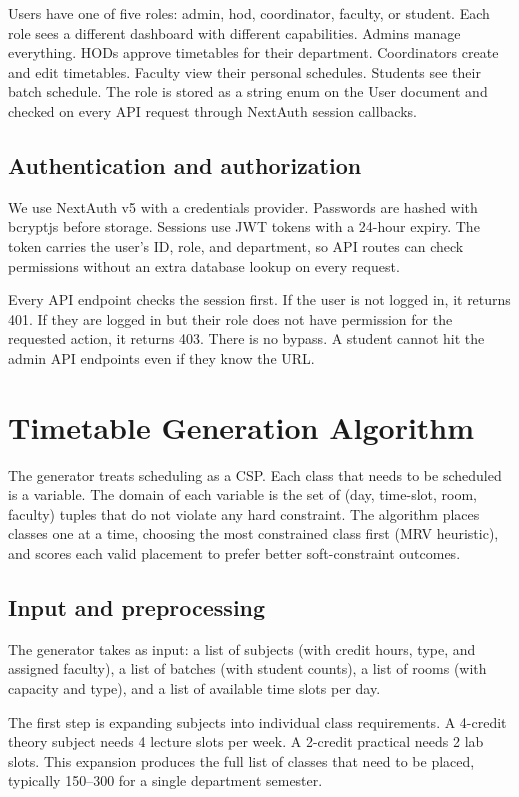 \documentclass[conference]{IEEEtran}
\begin{document}
Users have one of five roles: admin, hod, coordinator, faculty, or student. Each role sees a different dashboard with different capabilities. Admins manage everything. HODs approve timetables for their department. Coordinators create and edit timetables. Faculty view their personal schedules. Students see their batch schedule. The role is stored as a string enum on the User document and checked on every API request through NextAuth session callbacks.

\subsection{Authentication and authorization}

We use NextAuth v5 with a credentials provider. Passwords are hashed with bcryptjs before storage. Sessions use JWT tokens with a 24-hour expiry. The token carries the user's ID, role, and department, so API routes can check permissions without an extra database lookup on every request.

Every API endpoint checks the session first. If the user is not logged in, it returns 401. If they are logged in but their role does not have permission for the requested action, it returns 403. There is no bypass. A student cannot hit the admin API endpoints even if they know the URL.


\section{Timetable Generation Algorithm}

The generator treats scheduling as a CSP. Each class that needs to be scheduled is a variable. The domain of each variable is the set of (day, time-slot, room, faculty) tuples that do not violate any hard constraint. The algorithm places classes one at a time, choosing the most constrained class first (MRV heuristic), and scores each valid placement to prefer better soft-constraint outcomes.

\subsection{Input and preprocessing}

The generator takes as input: a list of subjects (with credit hours, type, and assigned faculty), a list of batches (with student counts), a list of rooms (with capacity and type), and a list of available time slots per day.

The first step is expanding subjects into individual class requirements. A 4-credit theory subject needs 4 lecture slots per week. A 2-credit practical needs 2 lab slots. This expansion produces the full list of classes that need to be placed, typically 150--300 for a single department semester.
\end{document}

